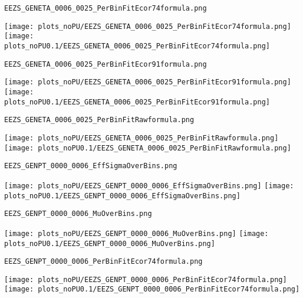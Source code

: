 \begin{frame}[fragile]
\begin{verbatim}
EEZS_GENETA_0006_0025_PerBinFitEcor74formula.png
\end{verbatim}
\texttt{[image: plots\_noPU/EEZS\_GENETA\_0006\_0025\_PerBinFitEcor74formula.png]}
\texttt{[image: plots\_noPU0.1/EEZS\_GENETA\_0006\_0025\_PerBinFitEcor74formula.png]}
\end{frame}
\begin{frame}[fragile]
\begin{verbatim}
EEZS_GENETA_0006_0025_PerBinFitEcor91formula.png
\end{verbatim}
\texttt{[image: plots\_noPU/EEZS\_GENETA\_0006\_0025\_PerBinFitEcor91formula.png]}
\texttt{[image: plots\_noPU0.1/EEZS\_GENETA\_0006\_0025\_PerBinFitEcor91formula.png]}
\end{frame}
\begin{frame}[fragile]
\begin{verbatim}
EEZS_GENETA_0006_0025_PerBinFitRawformula.png
\end{verbatim}
\texttt{[image: plots\_noPU/EEZS\_GENETA\_0006\_0025\_PerBinFitRawformula.png]}
\texttt{[image: plots\_noPU0.1/EEZS\_GENETA\_0006\_0025\_PerBinFitRawformula.png]}
\end{frame}
\begin{frame}[fragile]
\begin{verbatim}
EEZS_GENPT_0000_0006_EffSigmaOverBins.png
\end{verbatim}
\texttt{[image: plots\_noPU/EEZS\_GENPT\_0000\_0006\_EffSigmaOverBins.png]}
\texttt{[image: plots\_noPU0.1/EEZS\_GENPT\_0000\_0006\_EffSigmaOverBins.png]}
\end{frame}
\begin{frame}[fragile]
\begin{verbatim}
EEZS_GENPT_0000_0006_MuOverBins.png
\end{verbatim}
\texttt{[image: plots\_noPU/EEZS\_GENPT\_0000\_0006\_MuOverBins.png]}
\texttt{[image: plots\_noPU0.1/EEZS\_GENPT\_0000\_0006\_MuOverBins.png]}
\end{frame}
\begin{frame}[fragile]
\begin{verbatim}
EEZS_GENPT_0000_0006_PerBinFitEcor74formula.png
\end{verbatim}
\texttt{[image: plots\_noPU/EEZS\_GENPT\_0000\_0006\_PerBinFitEcor74formula.png]}
\texttt{[image: plots\_noPU0.1/EEZS\_GENPT\_0000\_0006\_PerBinFitEcor74formula.png]}
\end{frame}
